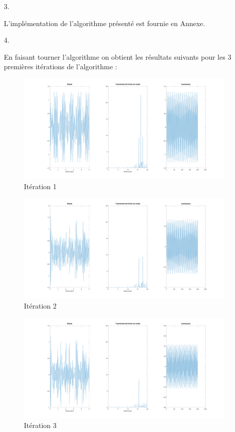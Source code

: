 \documentclass[12pt,a4paper,titlepage]{article}
\begin{document}
\begin{enumerate}
    \item[3.] 

        L'implémentation de l'algorithme présenté est fournie en Annexe.

    \item[4.] 

        En faisant tourner l'algorithme on obtient les résultats suivants pour les 3 premières
        itérations de l'algorithme : 

        \begin{figure}[H]
            \caption{Itération 1}
            \includegraphics[width=\textwidth]{iter1}
            \centering
        \end{figure}

        \begin{figure}[H]
            \caption{Itération 2}
            \includegraphics[width=\textwidth]{iter2}
            \centering
        \end{figure}

        \begin{figure}[H]
            \caption{Itération 3}
            \includegraphics[width=\textwidth]{iter3}
            \centering
        \end{figure}


\end{enumerate}
\end{document}
